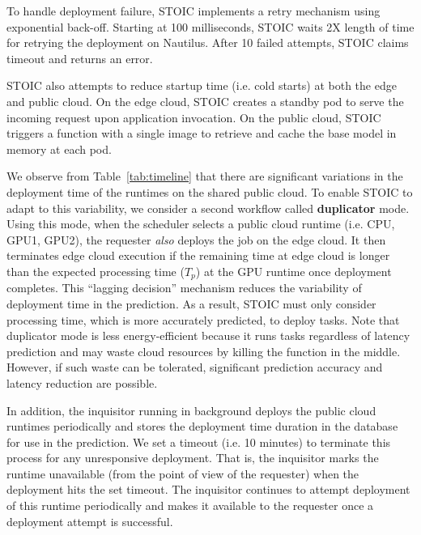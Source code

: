 To handle deployment failure, STOIC implements a retry mechanism using exponential back-off. Starting at 100 milliseconds, STOIC waits 2X length of time for retrying the deployment on Nautilus. After 10 failed attempts, STOIC claims timeout and returns an error.

STOIC also attempts to reduce startup time (i.e. cold starts) at both the edge and public cloud. On the edge cloud, STOIC creates a standby pod to serve the incoming request upon application invocation. On the public cloud, STOIC triggers a function with a single image to retrieve and cache the base model in memory at each pod.
 

We observe from Table~\ref{tab:timeline} that there are significant variations in the deployment time of the runtimes on the shared public cloud. To enable STOIC to adapt to this variability, we consider a second workflow called \textbf{duplicator} mode. Using this mode, when the scheduler selects a public cloud runtime (i.e. CPU, GPU1, GPU2), the requester \textit{also} deploys the job on the edge cloud. It then terminates edge cloud execution if the remaining time at edge cloud is longer than the expected processing time ($T_p$) at the GPU runtime once deployment completes. This ``lagging decision'' mechanism reduces the variability of deployment time in the prediction. As a result, STOIC must only consider processing time, which is more accurately predicted, to deploy tasks. Note that duplicator mode is less energy-efficient because it runs tasks regardless of latency prediction and may waste cloud resources by killing the function in the middle. However, if such waste can be tolerated, significant prediction accuracy and latency reduction are possible.

In addition, the inquisitor running in background deploys the public cloud runtimes periodically and stores the deployment time duration in the database for use in the prediction. We set a timeout (i.e. 10 minutes) to terminate this process for any unresponsive deployment. That is, the inquisitor marks the runtime unavailable (from the point of view of the requester) when the deployment hits the set timeout. The inquisitor continues to attempt deployment of this runtime periodically and makes it available to the requester once a deployment attempt is successful.

